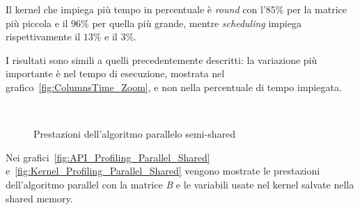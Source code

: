 Il kernel che impiega più tempo in percentuale è \textit{round} con l'$85\%$ per la matrice più piccola e il $96\%$ per quella più grande, mentre \textit{scheduling} impiega rispettivamente il $13\%$ e il $3\%$.

I risultati sono simili a quelli precedentemente descritti: la variazione più importante è nel tempo di esecuzione, mostrata nel grafico~\ref{fig:ColumnsTime_Zoom}, e non nella percentuale di tempo impiegata.

\begin{figure}[H]
	\centering
	 \\
	\caption{Prestazioni dell'algoritmo parallelo semi-shared}
\end{figure}

Nei grafici~\ref{fig:API_Profiling_Parallel_Shared} e~\ref{fig:Kernel_Profiling_Parallel_Shared} vengono mostrate le prestazioni dell'algoritmo parallel con la matrice \textit{B} e le variabili usate nel kernel salvate nella shared memory.

